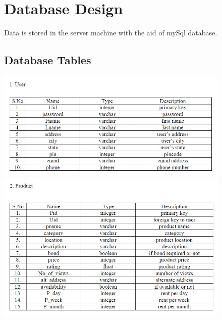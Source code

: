 \documentclass[11pt]{report}
\begin{document}
\begin{figure}[h]
\section{Database Design}
Data is stored in the server machine with the aid of mySql database.\\
\subsection{Database Tables}
  \centering
    \includegraphics[width=7in]{user.jpg} 
  \centering
    \includegraphics[width=7in]{product.jpg} 
   \end{figure}
\end{document}
